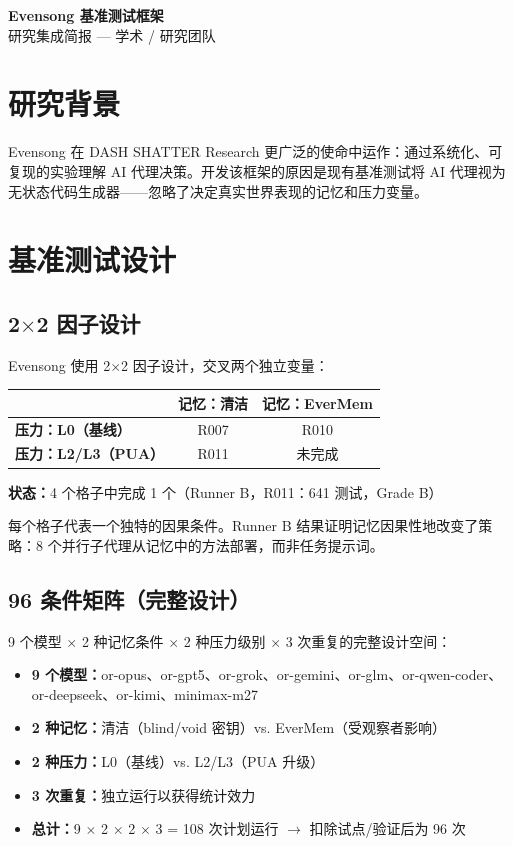 \documentclass[11pt,a4paper]{article}
\begin{document}
\begin{center}
{\fontsize{22pt}{28pt}\selectfont\sffamily\bfseries\color{deep}Evensong 基准测试框架}\\
{\fontsize{11pt}{14pt}\selectfont\sffamily\color{gray}研究集成简报 — 学术 / 研究团队}
\end{center}
\vspace{2mm}{\color{deep}\rule{\textwidth}{0.5pt}}\vspace{2mm}

\section{研究背景}

Evensong 在 DASH SHATTER Research 更广泛的使命中运作：通过系统化、可复现的实验理解 AI 代理决策。开发该框架的原因是现有基准测试将 AI 代理视为无状态代码生成器——忽略了决定真实世界表现的记忆和压力变量。

\section{基准测试设计}

\subsection{2$\times$2 因子设计}

Evensong 使用 2$\times$2 因子设计，交叉两个独立变量：

\begin{tabular}{l|c|c}
  & \textbf{记忆：清洁} & \textbf{记忆：EverMem} \\\hline
  \textbf{压力：L0（基线）} & R007 & R010 \\
  \textbf{压力：L2/L3（PUA）} & R011 & 未完成
\end{tabular}

\textbf{状态：}4 个格子中完成 1 个（Runner B，R011：641 测试，Grade B）

每个格子代表一个独特的因果条件。Runner B 结果证明记忆因果性地改变了策略：8 个并行子代理从记忆中的方法部署，而非任务提示词。

\subsection{96 条件矩阵（完整设计）}

9 个模型 $\times$ 2 种记忆条件 $\times$ 2 种压力级别 $\times$ 3 次重复的完整设计空间：

\begin{itemize}
  \item \textbf{9 个模型：}or-opus、or-gpt5、or-grok、or-gemini、or-glm、or-qwen-coder、or-deepseek、or-kimi、minimax-m27
  \item \textbf{2 种记忆：}清洁（blind/void 密钥）vs. EverMem（受观察者影响）
  \item \textbf{2 种压力：}L0（基线）vs. L2/L3（PUA 升级）
  \item \textbf{3 次重复：}独立运行以获得统计效力
  \item \textbf{总计：}9 $\times$ 2 $\times$ 2 $\times$ 3 = 108 次计划运行 $\to$ 扣除试点/验证后为 96 次
\end{itemize}
\end{document}
